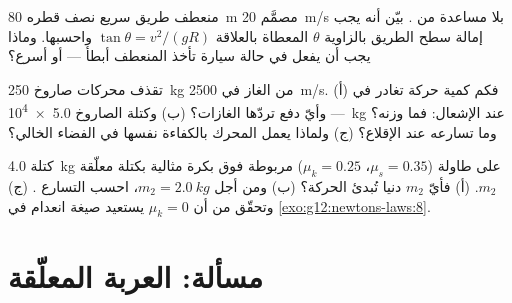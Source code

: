 \begin{exercise}[$\star\star\star$]\label{exo:g12:newtons-laws:13}
منعطف طريق سريع نصف قطره \qty{80}{m} مصمَّم  \qty{20}{m/s} بلا مساعدة من
. بيّن أنه يجب إمالة سطح الطريق بالزاوية $\theta$ المعطاة بالعلاقة
$\tan\theta = v^2/(gR)$ واحسبها. وماذا يجب أن يفعل  في حالة سيارة تأخذ
المنعطف أبطأ --- أو أسرع؟
\end{exercise}

\begin{exercise}[$\star\star\star$]\label{exo:g12:newtons-laws:14}
تقذف محركات صاروخ \qty{250}{kg} من الغاز في   \qty{2500}{m/s}. (أ) فكم
كمية حركة تغادر في  --- وأيّ  دفع تردّها الغازات؟ (ب) وكتلة الصاروخ
\qty{5.0e4}{kg} عند الإشعال: فما وزنه؟ وما تسارعه عند الإقلاع؟ (ج) ولماذا
يعمل المحرك بالكفاءة نفسها في الفضاء الخالي؟
\end{exercise}

\begin{exercise}[$\star\star\star$]\label{exo:g12:newtons-laws:15}
كتلة \qty{4.0}{kg} على طاولة ($\mu_s = 0.35$، $\mu_k = 0.25$) مربوطة فوق
بكرة مثالية بكتلة معلّقة $m_2$. (أ) فأيّ $m_2$ دنيا تُبدئ الحركة؟
(ب) ومن أجل $m_2 = \qty{2.0}{kg}$، احسب التسارع . (ج) وتحقّق من أن
$\mu_k = 0$ يستعيد صيغة انعدام  في \cref{exo:g12:newtons-laws:8}.
\end{exercise}

\section{مسألة: العربة المعلّقة}

